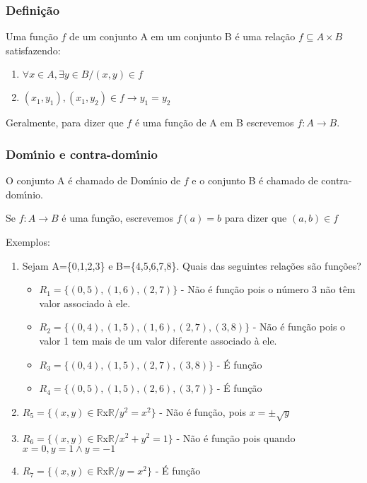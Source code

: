 \subsubsection{Defini{\c c}{\~a}o}
\begin{definicao}[Fun{\c c}{\~a}o] Uma fun{\c c}{\~a}o $f$ de um conjunto A em um conjunto B {\'e} uma rela{\c c}{\~a}o $f\subseteq A\times B$ satisfazendo:
\begin{enumerate}
\item $\forall x\in A,\exists y\in B/(x,y)\in f$
\item $(x_{1},y_{1}),(x_{1},y_{2})\in f \rightarrow y_{1}=y_{2}$
\end{enumerate}
\end{definicao}

Geralmente, para dizer que $f$ {\'e} uma fun{\c c}{\~a}o de A em B escrevemos $f:A\rightarrow B$.

\subsubsection{Dom{\'\i}nio e contra-dom{\'\i}nio}
O conjunto A {\'e} chamado de Dom{\'\i}nio de $f$ e o conjunto B {\'e} chamado de contra-dom{\'\i}nio.

Se $f:A\rightarrow B$ {\'e} uma fun{\c c}{\~a}o, escrevemos $f(a)=b$ para dizer que $(a,b)\in f$

Exemplos:
\begin{enumerate}
\item Sejam A=\{0,1,2,3\} e B=\{4,5,6,7,8\}. Quais das seguintes rela{\c c}{\~o}es s{\~a}o fun{\c c}{\~o}es?
\begin{itemize}
\item $R_{1}=\{(0,5),(1,6),(2,7)\}$ - N{\~a}o {\'e} fun{\c c}{\~a}o pois o n{\'u}mero 3 n{\~a}o t{\^e}m valor associado {\`a} ele.
\item $R_{2}=\{(0,4),(1,5),(1,6),(2,7),(3,8)\}$ - N{\~a}o {\'e} fun{\c c}{\~a}o pois o valor 1 tem mais de um valor diferente associado {\`a} ele.
\item $R_{3}=\{(0,4),(1,5),(2,7),(3,8)\}$ - {\'E} fun{\c c}{\~a}o
\item $R_{4}=\{(0,5),(1,5),(2,6),(3,7)\}$ - {\'E} fun{\c c}{\~a}o

\end{itemize}
\item $R_{5}=\{(x,y)\in\mathbb{R}$x$\mathbb{R}/y^{2}=x^{2}\}$ - N{\~a}o {\'e} fun{\c c}{\~a}o, pois $x=\pm \sqrt{y}$
\item $R_{6}=\{(x,y)\in\mathbb{R}$x$\mathbb{R}/x^{2}+y^{2}=1\}$ - N{\~a}o {\'e} fun{\c c}{\~a}o pois quando\\ $x=0,y=1\wedge y=-1$
\item  $R_{7}=\{(x,y)\in\mathbb{R}$x$\mathbb{R}/y=x^{2}\}$ - {\'E} fun{\c c}{\~a}o
\end{enumerate}


